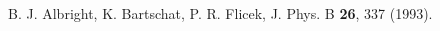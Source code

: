 \begin{thebibliography}{9}
\begin{comment}

\bibitem{Cinal:10}
M. Cinal, 
``Direct mapping between exchange potentials of Hartree--Fock and 
Kohn--Sham schemes as origin of orbital proximity'', 
Jour. Chem. Phys. {\bf 132}, 014101 (2010).

\bibitem{Becke:88}
A.D. Becke, 
``Density--functional exchange--energy approximation with correct 
asymptotic behavior", 
Phys. Rev. A {\bf 38}, 3098 (1988).

\bibitem{Weber:71}
T.A. Weber and R.G. Parr, 
``Hartree--Fock theory with exchange cutoff'', 
Phys. Rev. A {\bf 3}, 81 (1971).
 
\bibitem{Weber:70}
T.A. Weber, N.C. Handy, and R.G. Parr, 
``SelfConsistenfField atomic wavefunctions from efficient nested 
basis sets", 
J. of Chem. Phys. {\bf 52}, 1501 (1970).

\bibitem{Amusia:04}
M.Ya. Amusia, A.Z. Msezane, V.R. Shaginyan, and D. Sokolovski, 
``On the relation between the Hartree--Fock and Kohn--Sham
approaches'',
Phys. Lett. A {\bf 330}, 10 (2015).


\bibitem{HohenberKohn:64}
P. Hohenberg, W. Kohn, 
Phys. Rev., \textbf{136}, B864 (1964).

\bibitem{KohnSham:65}
W. Kohn, L. J. Sham, 
Phys. Rev. \textbf{140}, A1133 (1965).


\bibitem{Becke:14} 
A. D. Becke,
J. Chem. Phys. \textbf{140}, 18A301 (2014).

\bibitem{Bartlett:10} 
R. J. Bartlett, 
Mol. Phys. \textbf{108}, 3299-3311 (2010).

\bibitem{Verma:12} 
P. Verma, R. J. Bartlett,
J. Chem. Phys. \textbf{137}, 134102 (2012).

\bibitem{Mura:97}
M. E. Mura, P. J. Knowles, C. A. Reynolds, 
J. Chem. Phys. \textbf{106}, 9659--9667 (1997).

\bibitem{Umrigar:94} 
C. J. Umrigar, X. Gonze,
Phys. Rev. A \textbf{50}, 3827 (1994).

\bibitem{Gritsenko:97} 
O. V. Gritsenko, E. J. Baerends, 
Theor. Chem. Acc. \textbf{96}, 44 (1997).

\bibitem{Filippi:94} 
C. Filippi, C. J. Umrigar, M. Taut, 
J. Chem. Phys. \textbf{100}, 1290 (1994).

\end{comment}

B. J. Albright, K. Bartschat, P. R. Flicek,
J. Phys. B \textbf{26}, 337 (1993).


\end{thebibliography}
